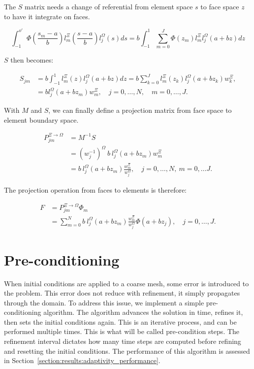 The \(S\) matrix needs a change of referential from element space \(s\) to face space \(z\) to have
it integrate on faces.

\begin{equation}
	\int_{-1}^{o'} \Phi(\frac{s_m -a}{b})l_m^\Xi(\frac{s -a}{b}) l_j^\Omega(s)ds
	= b\int_{-1}^{1}\sum_{m = 0}^{J} \Phi(z_m)l_m^{\Xi}l_j^{\Omega}(a + bz)dz
\end{equation}

\noindent
\(S\) then becomes: 

\begin{equation}
	\begin{aligned}
		S_{jm} &=  b\int_{-1}^{1}l_m^{\Xi}(z)l_j^{\Omega}(a + bz)dz
		= b\sum_{k = 0}^{J}l_m^{\Xi}(z_k)l_j^{\Omega}(a +b z_k)w_k^{\Xi}, \\
		&= b l_j^{\Omega}(a + bz_m)w_m^{\Xi}, \quad j = 0, \ldots, N, \quad m = 0, \ldots, J.
	\end{aligned}
\end{equation}

With \(M\) and \(S\), we can finally define a projection matrix from face space to element boundary
space.

\begin{equation}
	\begin{aligned}
		P^{\Xi \rightarrow \Omega}_{jm} &= M^{-1}S \\
		&= {(w_j^{-1})}^{\Omega } \: b \: l_j^{\Omega }(a + bz_m)w_m^{\Xi}\\
		&= b \: l_j^{\Omega}(a + bz_m)\frac{w_m^{\Xi}}{w_j^{\Omega}}, \quad j = 0, \ldots, N, \: m = 0, \ldots J. 
	\end{aligned}
\end{equation} 

The projection operation from faces to elements is therefore:

\begin{align} \label{projection_face_to_element}
	F &= P^{\Xi \rightarrow \Omega}_{jm} \Phi_m  \\
	&= \sum_{m = 0}^{N} b \: l_j^{\Omega}(a + bz_m)\frac{w_m^{\Xi}}{w_j^{\Omega}} \Phi (a + b z_j), \quad j = 0, \ldots, J.
\end{align}

\section{Pre-conditioning}\label{section:adaptive_mesh_refinement:pre_conditioning}

When initial conditions are applied to a coarse mesh, some error is introduced to the problem. This
error does not reduce with refinement, it simply propagates through the domain. To address this
issue, we implement a simple pre-conditioning algorithm. The algorithm advances the solution in
time, refines it, then sets the initial conditions again. This is an iterative process, and can be
performed multiple times. This is what will be called pre-condition steps. The refinement interval
dictates how many time steps are computed before refining and resetting the initial conditions. The
performance of this algorithm is assessed in Section~\ref{section:results:adaptivity_performance}.

